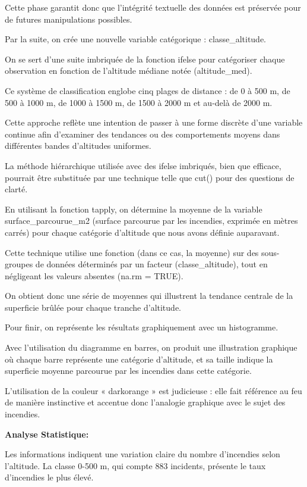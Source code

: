 \documentclass[
]{article}
\begin{document}
Cette phase garantit donc que l'intégrité textuelle des données est
préservée pour de futures manipulations possibles.

Par la suite, on crée une nouvelle variable catégorique :
classe\_altitude.

On se sert d'une suite imbriquée de la fonction ifelse pour catégoriser
chaque observation en fonction de l'altitude médiane notée
(altitude\_med).

Ce système de classification englobe cinq plages de distance : de 0 à
500 m, de 500 à 1000 m, de 1000 à 1500 m, de 1500 à 2000 m et au-delà de
2000 m.

Cette approche reflète une intention de passer à une forme discrète
d'une variable continue afin d'examiner des tendances ou des
comportements moyens dans différentes bandes d'altitudes uniformes.

La méthode hiérarchique utilisée avec des ifelse imbriqués, bien que
efficace, pourrait être substituée par une technique telle que cut()
pour des questions de clarté.

En utilisant la fonction tapply, on détermine la moyenne de la variable
surface\_parcourue\_m2 (surface parcourue par les incendies, exprimée en
mètres carrés) pour chaque catégorie d'altitude que nous avons définie
auparavant.

Cette technique utilise une fonction (dans ce cas, la moyenne) sur des
sous-groupes de données déterminés par un facteur (classe\_altitude),
tout en négligeant les valeurs absentes (na.rm = TRUE).

On obtient donc une série de moyennes qui illustrent la tendance
centrale de la superficie brûlée pour chaque tranche d'altitude.

Pour finir, on représente les résultats graphiquement avec un
histogramme.

Avec l'utilisation du diagramme en barres, on produit une illustration
graphique où chaque barre représente une catégorie d'altitude, et sa
taille indique la superficie moyenne parcourue par les incendies dans
cette catégorie.

L'utilisation de la couleur « darkorange » est judicieuse : elle fait
référence au feu de manière instinctive et accentue donc l'analogie
graphique avec le sujet des incendies.

\textbf{Analyse Statistique:}

Les informations indiquent une variation claire du nombre d'incendies
selon l'altitude. La classe 0-500 m, qui compte 883 incidents, présente
le taux d'incendies le plus élevé.
\end{document}
